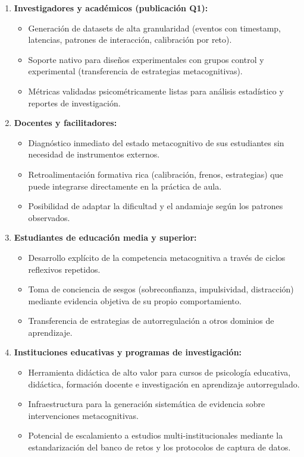 \documentclass[11pt,a4paper]{article}
\begin{document}
\begin{enumerate}
    \item \textbf{Investigadores y académicos (publicación Q1):}
    \begin{itemize}
        \item Generación de datasets de alta granularidad (eventos con timestamp, latencias, patrones de interacción, calibración por reto).
        \item Soporte nativo para diseños experimentales con grupos control y experimental (transferencia de estrategias metacognitivas).
        \item Métricas validadas psicométricamente listas para análisis estadístico y reportes de investigación.
    \end{itemize}
    
    \item \textbf{Docentes y facilitadores:}
    \begin{itemize}
        \item Diagnóstico inmediato del estado metacognitivo de sus estudiantes sin necesidad de instrumentos externos.
        \item Retroalimentación formativa rica (calibración, frenos, estrategias) que puede integrarse directamente en la práctica de aula.
        \item Posibilidad de adaptar la dificultad y el andamiaje según los patrones observados.
    \end{itemize}
    
    \item \textbf{Estudiantes de educación media y superior:}
    \begin{itemize}
        \item Desarrollo explícito de la competencia metacognitiva a través de ciclos reflexivos repetidos.
        \item Toma de conciencia de sesgos (sobreconfianza, impulsividad, distracción) mediante evidencia objetiva de su propio comportamiento.
        \item Transferencia de estrategias de autorregulación a otros dominios de aprendizaje.
    \end{itemize}
    
    \item \textbf{Instituciones educativas y programas de investigación:}
    \begin{itemize}
        \item Herramienta didáctica de alto valor para cursos de psicología educativa, didáctica, formación docente e investigación en aprendizaje autorregulado.
        \item Infraestructura para la generación sistemática de evidencia sobre intervenciones metacognitivas.
        \item Potencial de escalamiento a estudios multi-institucionales mediante la estandarización del banco de retos y los protocolos de captura de datos.
    \end{itemize}
\end{enumerate}
\end{document}
